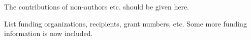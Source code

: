 \documentclass[
]{iucrjournals}
\begin{document}
\begin{acknowledgements}
The contributions of non-authors etc. should be given here.
\end{acknowledgements}

\begin{funding}
List funding organizations, recipients, grant numbers, etc. Some more
funding information is now included.
\end{funding}




\end{document}
